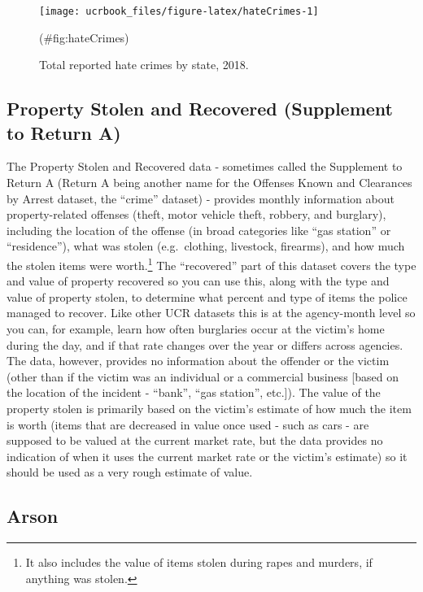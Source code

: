 \documentclass[
  12pt,
  openany]{book}
\begin{document}
\begin{figure}

{\centering \texttt{[image: ucrbook\_files/figure-latex/hateCrimes-1]} 

}

\caption{Total reported hate crimes by state, 2018.}(\#fig:hateCrimes)
\end{figure}

\hypertarget{property-stolen-and-recovered-supplement-to-return-a}{%
\subsection{Property Stolen and Recovered (Supplement to Return A)}\label{property-stolen-and-recovered-supplement-to-return-a}}

The Property Stolen and Recovered data - sometimes called the Supplement to Return A (Return A being another name for the Offenses Known and Clearances by Arrest dataset, the ``crime'' dataset) - provides monthly information about property-related offenses (theft, motor vehicle theft, robbery, and burglary), including the location of the offense (in broad categories like ``gas station'' or ``residence''), what was stolen (e.g.~clothing, livestock, firearms), and how much the stolen items were worth.\footnote{It also includes the value of items stolen during rapes and murders, if anything was stolen.} The ``recovered'' part of this dataset covers the type and value of property recovered so you can use this, along with the type and value of property stolen, to determine what percent and type of items the police managed to recover. Like other UCR datasets this is at the agency-month level so you can, for example, learn how often burglaries occur at the victim's home during the day, and if that rate changes over the year or differs across agencies. The data, however, provides no information about the offender or the victim (other than if the victim was an individual or a commercial business {[}based on the location of the incident - ``bank'', ``gas station'', etc.{]}). The value of the property stolen is primarily based on the victim's estimate of how much the item is worth (items that are decreased in value once used - such as cars - are supposed to be valued at the current market rate, but the data provides no indication of when it uses the current market rate or the victim's estimate) so it should be used as a very rough estimate of value.

\hypertarget{arson}{%
\subsection{Arson}\label{arson}}
\end{document}
